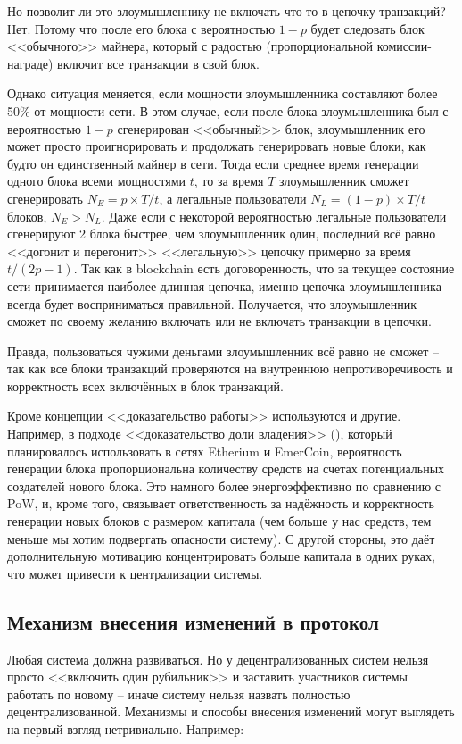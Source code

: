 Но позволит ли это злоумышленнику не включать что-то в цепочку транзакций? Нет. Потому что после его блока с вероятностью $1 - p$ будет следовать блок <<обычного>> майнера, который с радостью (пропорциональной комиссии-награде) включит все транзакции в свой блок.

Однако ситуация меняется, если мощности злоумышленника составляют более 50\% от мощности сети. В этом случае, если после блока злоумышленника был с вероятностью $1 - p$ сгенерирован <<обычный>> блок, злоумышленник его может просто проигнорировать и продолжать генерировать новые блоки, как будто он единственный майнер в сети. Тогда если среднее время генерации одного блока всеми мощностями $t$, то за время $T$ злоумышленник сможет сгенерировать $N_E = p \times T / t$, а легальные пользователи $N_L = (1 - p) \times T / t$ блоков, $N_E > N_L$. Даже если с некоторой вероятностью легальные пользователи сгенерируют 2 блока быстрее, чем злоумышленник один, последний всё равно <<догонит и перегонит>> <<легальную>> цепочку примерно за время $t / (2p - 1)$. Так как в blockchain есть договоренность, что за текущее состояние сети принимается наиболее длинная цепочка, именно цепочка злоумышленника всегда будет восприниматься правильной. Получается, что злоумышленник сможет по своему желанию включать или не включать транзакции в цепочки.

Правда, пользоваться чужими деньгами злоумышленник всё равно не сможет -- так как все блоки транзакций проверяются на внутреннюю непротиворечивость и корректность всех включённых в блок транзакций.

Кроме концепции <<доказательство работы>> используются и другие. Например, в подходе <<доказательство доли владения>> (), который планировалось использовать в сетях Etherium и EmerCoin, вероятность генерации блока пропорциональна количеству средств на счетах потенциальных создателей нового блока. Это намного более энергоэффективно по сравнению с PoW, и, кроме того, связывает ответственность за надёжность и корректность генерации новых блоков с размером капитала (чем больше у нас средств, тем меньше мы хотим подвергать опасности систему). С другой стороны, это даёт дополнительную мотивацию концентрировать больше капитала в одних руках, что может привести к централизации системы.

\subsection{Механизм внесения изменений в протокол}
Любая система должна развиваться. Но у децентрализованных систем нельзя просто <<включить один рубильник>> и заставить участников системы работать по новому -- иначе систему нельзя назвать полностью децентрализованной. Механизмы и способы внесения изменений могут выглядеть на первый взгляд нетривиально. Например:

